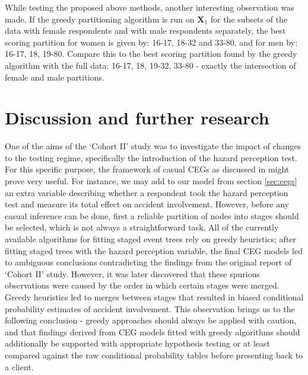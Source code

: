 \documentclass[runningheads]{llncs}
\begin{document}
While testing the proposed above methods, another interesting observation was made. If the greedy partitioning algorithm is run on $\boldsymbol{X}_1$ for the subsets of the data with female respondents and with male respondents separately, the best scoring partition for women is given by: 16-17, 18-32 and 33-80, and for men by: 16-17, 18, 19-80. Compare this to the best scoring partition found by the greedy algorithm with the full data: 16-17, 18, 19-32, 33-80 - exactly the intersection of female and male partitions.


%
%
\section{Discussion and further research}\label{sec:discussion}
One of the aims of the `Cohort II' study was to investigate the impact of changes to the testing regime, specifically the introduction of the hazard perception test. For this specific purpose, the framework of casual CEGs as discussed in \cite{smith2017cegs} might prove very useful. For instance, we may add to our model from section \ref{sec:cegs} an extra variable describing whether a respondent took the hazard perception test and measure its total effect on accident involvement. However, before any casual inference can be done, first a reliable partition of nodes into stages should be selected, which is not always a straightforward task. All of the currently available algorithms for fitting staged event trees rely on greedy heuristics; after fitting staged trees with the hazard perception variable, the final CEG models led to ambiguous conclusions contradicting the findings from the original report of `Cohort II' study. However, it was later discovered that these spurious observations were caused by the order in which certain stages were merged. Greedy heuristics led to merges between stages that resulted in biased conditional probability estimates of accident involvement. This observation brings us to the following conclusion - greedy approaches should always be applied with caution, and that findings derived from CEG models fitted with greedy algorithms should additionally be supported with appropriate hypothesis testing or at least compared against the raw conditional probability tables before presenting back to a client. 
\end{document}
